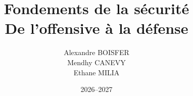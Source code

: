 \title{Fondements de la sécurité\\\large De l'offensive à la défense}
\author{Alexandre BOISFER\\Mendhy CANEVY\\Ethane MILIA}
\date{2026--2027}
